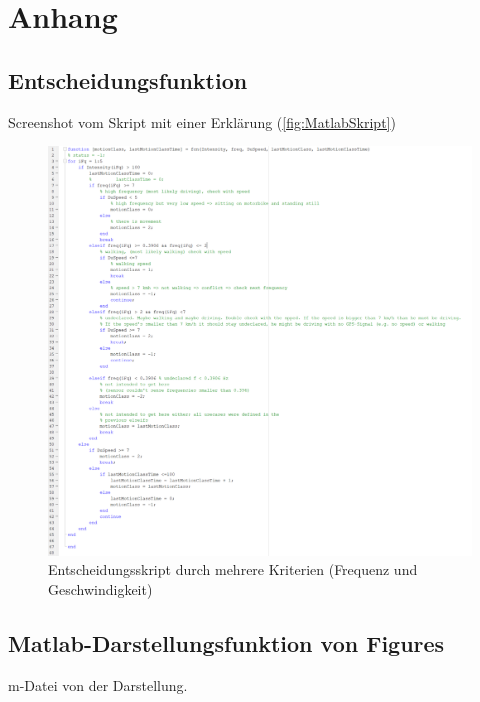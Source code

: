 \chapter{Anhang} \label{chap:Anhang}
\section{Entscheidungsfunktion} \label{Anh:Entscheidungsfunktion}
Screenshot vom Skript mit einer Erklärung (\autoref{fig:MatlabSkript})
\begin{figure}[H]
	\centering
	\includegraphics[width=\linewidth]{Bilder/MatlabSkript.png}
	\caption{Entscheidungsskript durch mehrere Kriterien (Frequenz und Geschwindigkeit)}
	\label{fig:MatlabSkript}
\end{figure}

\section{Matlab-Darstellungsfunktion von Figures}

m-Datei von der Darstellung.
